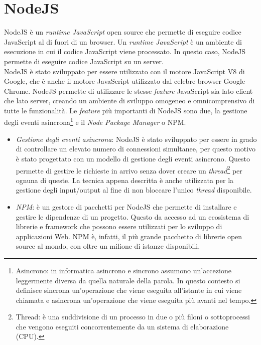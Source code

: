 \section{NodeJS}\label{sec:NodeJS}
NodeJS è un \textit{runtime JavaScript} open source che permette di eseguire codice JavaScript al di fuori di un browser\cite{NodeJS}. Un \textit{runtime JavaScript} è un ambiente
di esecuzione in cui il codice JavaScript viene processato. In questo caso, NodeJS permette di eseguire codice JavaScript su un server.\\
NodeJS è stato sviluppato per essere utilizzato con il motore JavaScript V8 di Google, che è anche il motore JavaScript utilizzato dal celebre browser Google Chrome. NodeJS permette 
di utilizzare le stesse \textit{feature} JavaScript sia lato client che lato server, creando un ambiente di sviluppo omogeneo e omnicomprensivo di tutte le funzionalità. Le 
\textit{feature} più importanti di NodeJS sono due, la gestione degli eventi asincrona\footnote{Asincrono: in informatica asincrono e sincrono assumono un'accezione leggermente 
diversa da quella naturale della parola. In questo contesto si definisce sincrona un'operazione che viene eseguita all'istante in cui viene chiamata e asincrona un'operazione che 
viene eseguita più avanti nel tempo.} e il \textit{Node Package Manager} o NPM.
\begin{itemize}
    \item \textit{Gestione degli eventi asincrona}: NodeJS è stato sviluppato per essere in grado di controllare un elevato numero di connessioni simultanee, per questo motivo è 
    stato progettato con un modello di gestione degli eventi asincrono. Questo permette di gestire le richieste in arrivo senza dover creare un \textit{thread}\footnote{
        Thread: è una suddivisione di un processo in due o più filoni o sottoprocessi che vengono eseguiti concorrentemente da un sistema di elaborazione (CPU).
    } per ognuna di queste. La tecnica appena descritta è anche utilizzata per la gestione degli input/output al fine di non bloccare l'unico \textit{thread} disponibile.
    \item \textit{NPM}: è un gestore di pacchetti per NodeJS che permette di installare e gestire le dipendenze di un progetto. Questo da accesso ad un ecosistema di
    librerie e framework che possono essere utilizzati per lo sviluppo di applicazioni Web. NPM è, infatti, il più grande pacchetto di librerie open source al mondo, con oltre un 
    milione di istanze disponibili.
\end{itemize}
